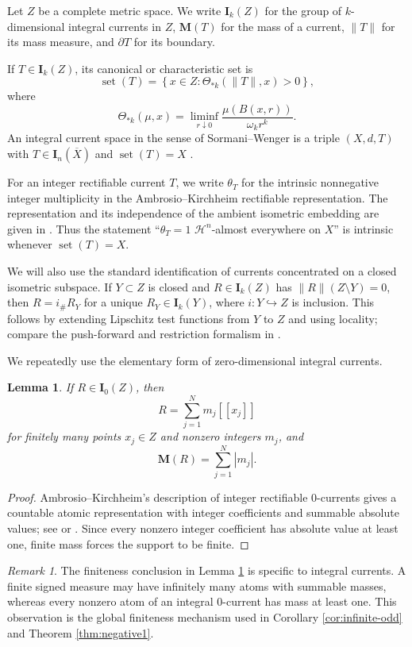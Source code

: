 \documentclass[11pt]{article}
\newtheorem{lemma}[theorem]{Lemma}
\theoremstyle{remark}
\newtheorem{remark}[theorem]{Remark}
\newcommand{\M}{\mathbf M}
\newcommand{\I}{\mathbf I}
\newcommand{\Hh}{\mathcal H}
\newcommand{\set}{\operatorname{set}}
\newcommand{\llbracket}{[\![}
\newcommand{\rrbracket}{]\!]}
\begin{document}
Let $Z$ be a complete metric space. We write $\I_k(Z)$ for the group of $k$-dimensional integral currents in $Z$, $\M(T)$ for the mass of a current, $\|T\|$ for its mass measure, and $\partial T$ for its boundary.

If $T\in\I_k(Z)$, its canonical or characteristic set is
\[
 \set(T)
 =\left\{x\in Z:
 \Theta_{*k}(\|T\|,x)>0
 \right\},
\]
where
\[
 \Theta_{*k}(\mu,x)
 =\liminf_{r\downarrow0}
   \frac{\mu(B(x,r))}{\omega_k r^k}.
\]
An integral current space in the sense of Sormani--Wenger is a triple $(X,d,T)$ with $T\in\I_n(\overline X)$ and $\set(T)=X$ \cite{SW11}.

For an integer rectifiable current $T$, we write $\theta_T$ for the intrinsic nonnegative integer multiplicity in the Ambrosio--Kirchheim rectifiable representation. The representation and its independence of the ambient isometric embedding are given in \cite[Theorems 9.5--9.6]{AK00}. Thus the statement ``$\theta_T=1$ $\Hh^n$-almost everywhere on $X$'' is intrinsic whenever $\set(T)=X$.

We will also use the standard identification of currents concentrated on a closed isometric subspace. If $Y\subset Z$ is closed and $R\in\I_k(Z)$ has $\|R\|(Z\setminus Y)=0$, then $R=i_\#R_Y$ for a unique $R_Y\in\I_k(Y)$, where $i:Y\hookrightarrow Z$ is inclusion. This follows by extending Lipschitz test functions from $Y$ to $Z$ and using locality; compare the push-forward and restriction formalism in \cite{AK00,Lang11}.

We repeatedly use the elementary form of zero-dimensional integral currents.

\begin{lemma}\label{lem:I0}
If $R\in\I_0(Z)$, then
\[
   R=\sum_{j=1}^{N} m_j\llbracket x_j\rrbracket
\]
for finitely many points $x_j\in Z$ and nonzero integers $m_j$, and
\[
   \M(R)=\sum_{j=1}^{N}|m_j|.
\]
\end{lemma}

\begin{proof}
Ambrosio--Kirchheim's description of integer rectifiable $0$-currents gives a countable atomic representation with integer coefficients and summable absolute values; see \cite[Section 4]{AK00} or \cite[Section 2]{Wenger07}. Since every nonzero integer coefficient has absolute value at least one, finite mass forces the support to be finite.
\end{proof}

\begin{remark}\label{rem:integer-atoms}
The finiteness conclusion in Lemma \ref{lem:I0} is specific to integral currents. A finite signed measure may have infinitely many atoms with summable masses, whereas every nonzero atom of an integral $0$-current has mass at least one. This observation is the global finiteness mechanism used in Corollary \ref{cor:infinite-odd} and Theorem \ref{thm:negative1}.
\end{remark}
\end{document}
